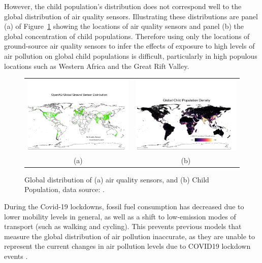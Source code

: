 However, the child population’s distribution does not correspond well to the global distribution of air quality sensors. Illustrating these distributions are panel (a) of Figure~\ref{fig:maps} showing the locations of air quality sensors and panel (b) the global concentration of child populations. Therefore using only the locations of ground-source air quality sensors to infer the effects of exposure to high levels of air pollution on global child populations is difficult, particularly in high populous locations such as Western Africa and the Great Rift Valley.

\begin{figure}
    \centering
    \begin{tabular}{cc}
    \includegraphics[width=.49\textwidth]{sensormap.png} &
    \includegraphics[width=.49\textwidth]{childmap.png}\\
    (a) & (b)
    \end{tabular}
    \caption{Global distribution of (a) air quality sensors, and (b) Child Population, data source: \citet{silent}.}
    \label{fig:maps}
\end{figure}

During the Covid-19 lockdowns, fossil fuel consumption has decreased due to lower mobility levels in general, as well as a shift to low-emission modes of transport (such as walking and cycling). This prevents previous models that measure the global distribution of air pollution inaccurate, as they are unable to represent the current changes in air pollution levels due to COVID19 lockdown events \cite{stateof}.

